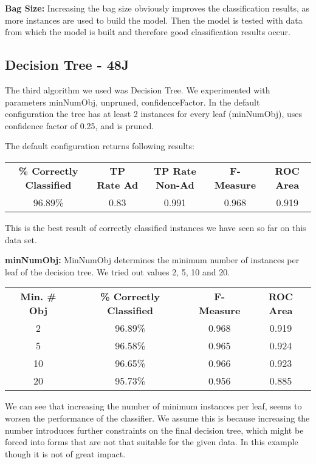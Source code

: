 \documentclass{article}
\begin{document}
\textbf{Bag Size:}
Increasing the bag size obviously improves the classification results, as more instances are used to build the model. Then the model is tested with data from which the model is built and therefore good classification results occur.

\subsection{Decision Tree - 48J}
The third algorithm we used was Decision Tree. We experimented with parameters minNumObj, unpruned, confidenceFactor. In the default configuration the tree has at least 2 instances for every leaf (minNumObj), uses confidence factor of 0.25, and is pruned.

The default configuration returns following results:

\begin{center}
\begin{tabular}{c | c | c | c | c}
\textbf{\% Correctly Classified} & \textbf{TP Rate Ad} & \textbf{TP Rate Non-Ad} & \textbf{F-Measure} & \textbf{ROC Area}\\
96.89\% & 0.83 & 0.991  & 0.968 & 0.919\\
\end{tabular}
\end{center}

This is the best result of correctly classified instances we have seen so far on this data set.

\textbf{minNumObj:}
MinNumObj determines the minimum number of instances per leaf of the decision tree. We tried out values 2, 5, 10 and 20.

\begin{center}
\begin{tabular}{ c | c | c | c}
\textbf{Min. \# Obj} & \textbf{\% Correctly Classified} & \textbf{F-Measure} & \textbf{ROC Area}\\
2  & 96.89\% & 0.968 & 0.919\\
5  & 96.58\% & 0.965 & 0.924\\
10 & 96.65\% & 0.966 & 0.923\\
20 & 95.73\% & 0.956 & 0.885\\
\end{tabular}
\end{center}

We can see that increasing the number of minimum instances per leaf, seems to worsen the performance of the classifier. We assume this is because increasing the number introduces further constraints on the final decision tree, which might be forced into forms that are not that suitable for the given data. In this example though it is not of great impact.
\end{document}
